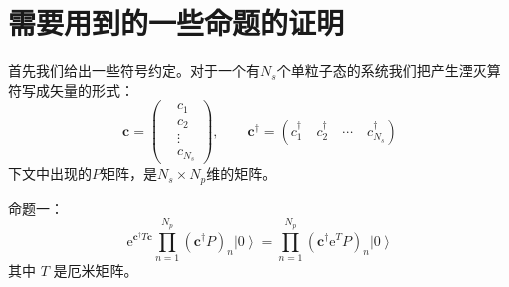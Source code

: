 \documentclass[UTF8,cs4size]{ctexart}
\def\ee{\mathrm e}
\begin{document}
\section{需要用到的一些命题的证明}
\label{bookproof}
首先我们给出一些符号约定。对于一个有$N_s$个单粒子态的系统我们把产生湮灭算符写成矢量的形式：
\[
    \mathbf{c}=
        \left(
            \begin{aligned}
                &c_{1}\\
                &c_{2}\\
                &\vdots\\
                &c_{N_s}
            \end{aligned}
        \right),
    \qquad
    \mathbf{c^{\dag}}=
        \left(
            c^{\dag}_{1} \quad c^{\dag}_{2} \quad \cdots \quad c^{\dag}_{N_s}
        \right)
\]
下文中出现的$P$矩阵，是$N_s\times N_p$维的矩阵。%

\noindent 命题一：
\[
    \ee^{\mathbf{c^{\dag}}T \mathbf{c}} \prod_{n=1}^{N_p}\left( \mathbf{c^{\dag}} P\right)_{n}
        \left|0\right>
    =\prod_{n=1}^{N_p}\left( \mathbf{c^{\dag}} \ee^{T} P\right)_{n}\left|0\right>
\]
其中 $T$ 是厄米矩阵。
\end{document}
